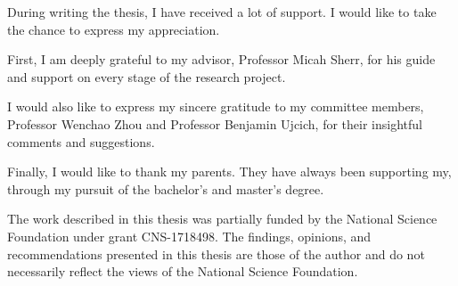 \documentclass[12pt]{report}
\begin{document}
During writing the thesis, I have received a lot of support. I would like to take the chance to express my appreciation.

First, I am deeply grateful to my advisor, Professor Micah Sherr, for his guide and support on every stage of the research project. 

I would also like to express my sincere gratitude to my committee members, Professor Wenchao Zhou and Professor Benjamin Ujcich, for their insightful comments and suggestions. 

Finally, I would like to thank my parents. They have always been supporting my, through my pursuit of the bachelor's and master's degree.

The work described in this thesis was partially funded by the National Science Foundation under grant CNS-1718498.  The findings, opinions, and recommendations presented in this thesis are those of the author and do not necessarily reflect the views of the National Science Foundation.





\tableofcontents

\listoffigures  %

\newpage
















%




\typeout{***}
\typeout{***}
\end{document}
